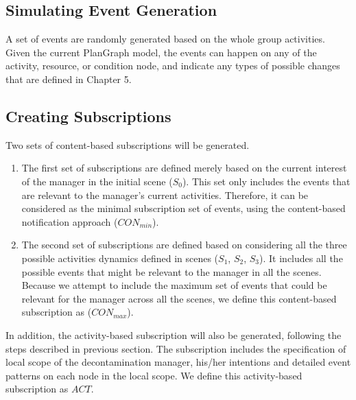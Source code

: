 \subsection{Simulating Event Generation} %
\label{sub:event_generation}
A set of events are randomly generated based on the whole group activities. Given the current PlanGraph model, the events can happen on any of the activity, resource, or condition node, and indicate any types of possible changes that are defined in Chapter 5.

\subsection{Creating Subscriptions} %
\label{sub:content_based_subscriptions}
Two sets of content-based subscriptions will be generated. 
\begin{enumerate}
	\item The first set of subscriptions are defined merely based on the current interest of the manager in the initial scene ($S_0$). This set only includes the events that are relevant to the manager's current activities. Therefore, it can be considered as the minimal subscription set of events, using the content-based notification approach ($CON_{min}$).
	\item The second set of subscriptions are defined based on considering all the three possible activities dynamics defined in scenes ($S_1$, $S_2$, $S_3$). It includes all the possible events that might be relevant to the manager in all the scenes. Because we attempt to include the maximum set of events that could be relevant for the manager across all the scenes, we define this content-based subscription as ($CON_{max}$).  
\end{enumerate}

In addition, the activity-based subscription will also be generated, following the steps described in previous section. The subscription includes the specification of local scope of the decontamination manager, his/her intentions and detailed event patterns on each node in the local scope. We define this activity-based subscription as $ACT$.

